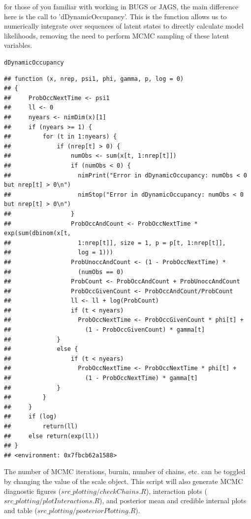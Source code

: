 \documentclass{article}\usepackage[]{graphicx}\usepackage[]{color}
\makeatletter
\newcommand{\hlstd}[1]{\textcolor[rgb]{0.345,0.345,0.345}{#1}}%
\newenvironment{kframe}{%
 \def\at@end@of@kframe{}%
 \ifinner\ifhmode%
  \def\at@end@of@kframe{\end{minipage}}%
  \begin{minipage}{\columnwidth}%
 \fi\fi%
 \def\FrameCommand##1{\hskip\@totalleftmargin \hskip-\fboxsep
 \colorbox{shadecolor}{##1}\hskip-\fboxsep
     \hskip-\linewidth \hskip-\@totalleftmargin \hskip\columnwidth}%
 \MakeFramed {\advance\hsize-\width
   \@totalleftmargin\z@ \linewidth\hsize
   \@setminipage}}%
 {\par\unskip\endMakeFramed%
 \at@end@of@kframe}
\newenvironment{knitrout}{}{} %
\makeatother
\begin{document}
for those of you familiar with working in BUGS or JAGS, the main
difference here is the call to 'dDynamicOccupancy'. This is the
function allows us to numerically integrate over sequences of latent
states to directly calculate model likelihoods, removing the need to
perform MCMC sampling of these latent variables.



\begin{knitrout}
\color{fgcolor}\begin{kframe}
\begin{alltt}
\hlstd{dDynamicOccupancy}
\end{alltt}
\begin{verbatim}
## function (x, nrep, psi1, phi, gamma, p, log = 0) 
## {
##     ProbOccNextTime <- psi1
##     ll <- 0
##     nyears <- nimDim(x)[1]
##     if (nyears >= 1) {
##         for (t in 1:nyears) {
##             if (nrep[t] > 0) {
##                 numObs <- sum(x[t, 1:nrep[t]])
##                 if (numObs < 0) {
##                   nimPrint("Error in dDynamicOccupancy: numObs < 0 but nrep[t] > 0\n")
##                   nimStop("Error in dDynamicOccupancy: numObs < 0 but nrep[t] > 0\n")
##                 }
##                 ProbOccAndCount <- ProbOccNextTime * exp(sum(dbinom(x[t, 
##                   1:nrep[t]], size = 1, p = p[t, 1:nrep[t]], 
##                   log = 1)))
##                 ProbUnoccAndCount <- (1 - ProbOccNextTime) * 
##                   (numObs == 0)
##                 ProbCount <- ProbOccAndCount + ProbUnoccAndCount
##                 ProbOccGivenCount <- ProbOccAndCount/ProbCount
##                 ll <- ll + log(ProbCount)
##                 if (t < nyears) 
##                   ProbOccNextTime <- ProbOccGivenCount * phi[t] + 
##                     (1 - ProbOccGivenCount) * gamma[t]
##             }
##             else {
##                 if (t < nyears) 
##                   ProbOccNextTime <- ProbOccNextTime * phi[t] + 
##                     (1 - ProbOccNextTime) * gamma[t]
##             }
##         }
##     }
##     if (log) 
##         return(ll)
##     else return(exp(ll))
## }
## <environment: 0x7fbcb62a1588>
\end{verbatim}
\end{kframe}
\end{knitrout}

The number of MCMC iterations, burnin, number of chains, etc. can be
toggled by changing the value of the scale object. This script will
also generate MCMC diagnostic figures ($src\_plotting/checkChains.R$),
interaction plots ($src\_plotting/plotInteractions.R$), and posterior
mean and credible internal plots and table ($src\_plotting/posteriorPlotting.R$).
\end{document}
